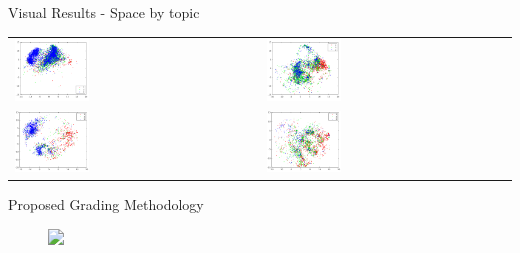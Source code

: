 \documentclass[usenames,dvipsnames]{beamer}
\begin{document}
\begin{frame}{Visual Results - Space by topic}
\vspace{-0.45cm}
\begin{table}[]
\begin{tabular}{ll}
 \includegraphics[width=0.31\textwidth]{imagenes/cluster3.png}& \includegraphics[width=0.31\textwidth]{imagenes/cluster4.png} \\
\includegraphics[width=0.31\textwidth]{imagenes/cluster8.png} & \includegraphics[width=0.31\textwidth]{imagenes/clustes7.png}
\end{tabular}
\end{table}

\end{frame}


\begin{frame}{Proposed Grading Methodology}
\begin{figure}
\centering
\includegraphics<1>[width=0.95\linewidth]{imagenes/metodo_sipaim2017.png}
\end{figure}
\end{frame}
\end{document}
